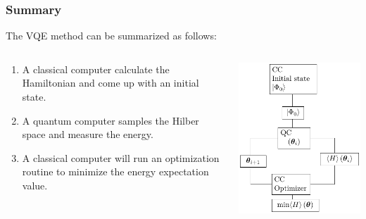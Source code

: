 \documentclass{beamer}
\renewcommand{\(}{\left(}
\renewcommand{\)}{\right)}
\renewcommand{\[}{\left[}
\renewcommand{\]}{\right]}
\begin{document}
\begin{frame}
    \frametitle{Summary}

    The VQE method can be summarized as follows: 
    \begin{columns}
        \begin{column}[]{0.5\textwidth}
            \begin{enumerate}
                \item A classical computer calculate the Hamiltonian and come up with an initial state. 
                \item A quantum computer samples the Hilber space and measure the energy. 
                \item A classical computer will run an optimization routine to minimize the energy expectation value. 
            \end{enumerate}
        \end{column}
        \begin{column}[]{0.5\textwidth}
            \begin{center}
                \includegraphics[scale=0.93]{VQE_flow_chart.pdf}
            \end{center}
        \end{column}
    \end{columns}
    

\end{frame}
\end{document}
